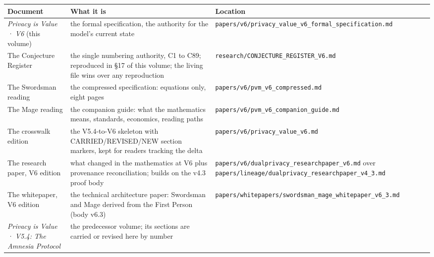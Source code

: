 \documentclass[
]{article}
\newcounter{none} %
\begin{document}
{\def\LTcaptype{none} %
\begin{longtable}[]{@{}
  >{\raggedright\arraybackslash}p{}
  >{\raggedright\arraybackslash}p{}
  >{\raggedright\arraybackslash}p{}@{}}
\toprule\noalign{}
\begin{minipage}[b]{\linewidth}\raggedright
Document
\end{minipage} & \begin{minipage}[b]{\linewidth}\raggedright
What it is
\end{minipage} & \begin{minipage}[b]{\linewidth}\raggedright
Location
\end{minipage} \\
\midrule\noalign{}
\endhead
\bottomrule\noalign{}
\endlastfoot
\emph{Privacy is Value · V6} (this volume) & the formal specification,
the authority for the model's current state &
\texttt{papers/v6/privacy\_value\_v6\_formal\_specification.md} \\
The Conjecture Register & the single numbering authority, C1 to C89;
reproduced in §17 of this volume; the living file wins over any
reproduction & \texttt{research/CONJECTURE\_REGISTER\_V6.md} \\
The Swordsman reading & the compressed specification: equations only,
eight pages & \texttt{papers/v6/pvm\_v6\_compressed.md} \\
The Mage reading & the companion guide: what the mathematics means,
standards, economics, reading paths &
\texttt{papers/v6/pvm\_v6\_companion\_guide.md} \\
The crosswalk edition & the V5.4-to-V6 skeleton with CARRIED/REVISED/NEW
section markers, kept for readers tracking the delta &
\texttt{papers/v6/privacy\_value\_v6.md} \\
The research paper, V6 edition & what changed in the mathematics at V6
plus provenance reconciliation; builds on the v4.3 proof body &
\texttt{papers/v6/dualprivacy\_researchpaper\_v6.md} over
\texttt{papers/lineage/dualprivacy\_researchpaper\_v4\_3.md} \\
The whitepaper, V6 edition & the technical architecture paper: Swordsman
and Mage derived from the First Person (body v6.3) &
\texttt{papers/whitepapers/swordsman\_mage\_whitepaper\_v6\_3.md} \\
\emph{Privacy is Value · V5.4: The Amnesia Protocol} & the predecessor
volume; its sections are carried or revised here by number &

\end{longtable}}
\end{document}
